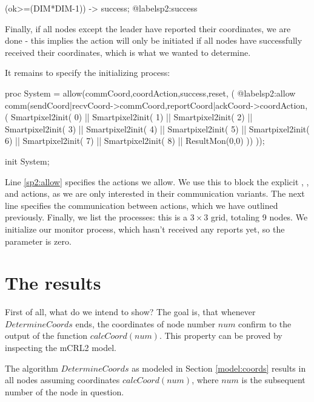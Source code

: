 \begin{codeverb}
(ok>=(DIM*DIM-1)) -> success; @label{sp2:success}
\end{codeverb}

Finally, if all nodes except the leader have reported their coordinates, we are done - this implies the  action will only be initiated if all nodes have successfully received their coordinates, which is what we wanted to determine.

It remains to specify the initializing process:

\begin{codeverb}
proc    System =
	 allow({commCoord,coordAction,success,reset}, ( @label{sp2:allow}
	  comm({sendCoord|recvCoord->commCoord,reportCoord|ackCoord->coordAction}, (
	     Smartpixel2init( 0) || Smartpixel2init( 1) || Smartpixel2init( 2) ||
	     Smartpixel2init( 3) || Smartpixel2init( 4) || Smartpixel2init( 5) ||
	     Smartpixel2init( 6) || Smartpixel2init( 7) || Smartpixel2init( 8) ||
             ResultMon(0,0)
          ))
         ));

init    System;
\end{codeverb}

Line \ref{sp2:allow} specifies the actions we allow. We use this to block the explicit , ,  and  actions, as we are only interested in their communication variants. The next line specifies the communication between actions, which we have outlined previously. Finally, we list the processes: this is a $3 \times 3$ grid, totaling 9 nodes. We initialize our monitor process, which hasn't received any reports yet, so the parameter is zero.

\section{The results}

First of all, what do we intend to show? The goal is, that whenever $DetermineCoords$ ends, the coordinates of node number $num$ confirm to the output of the function $calcCoord(num)$. This property can be proved by inspecting the mCRL2 model.
\\
\begin{property} \label{prop:correctcoords}
The algorithm $DetermineCoords$ as modeled in Section \ref{model:coords} results in all nodes assuming coordinates $calcCoord(num)$, where $num$ is the subsequent number of the node in question.
\end{property}

